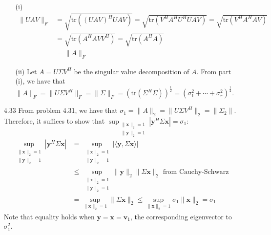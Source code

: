 \documentclass[letterpaper,12pt]{article}
\theoremstyle{definition}
\begin{document}
\begin{enumerate}
\begin{enumerate}
      \item[(i)]
      \begin{align*}
        \|UAV\|_F &= \sqrt{\text{tr}((UAV)^HUAV)} = \sqrt{\text{tr}(V^HA^HU^HUAV)} = \sqrt{\text{tr}(V^HA^HAV)} \\
        &= \sqrt{\text{tr}(A^HAVV^H)} = \sqrt{\text{tr}(A^HA)} \\
        &=\|A\|_F
      \end{align*}
      \item[(ii)]
        Let $A = U\Sigma V^H$ be the singular value decomposition of $A$. From part (i), we have that $\|A\|_F=\|U\Sigma V^H\|_F=\|\Sigma\|_F=(\text{tr}(\Sigma^H\Sigma))^\frac{1}{2}=(\sigma_1^2+\cdots+\sigma_r^2)^\frac{1}{2}$.
    \end{enumerate}
  \item[4.33]
    From problem 4.31, we have that $\sigma_1 = \|A\|_2=\|U\Sigma V^H\|_2=\|\Sigma_2\|$. Therefore, it suffices to show that $\sup_{\substack{\|\mathbf{x}\|_2=1\\ \|\mathbf{y}\|_2=1}}|\mathbf{y}^H\Sigma\mathbf{x}|=\sigma_1$:
    \begin{align*}
        \sup_{\substack{\|\mathbf{x}\|_2=1\\\|\mathbf{y}\|_2=1}}|\mathbf{y}^H\Sigma\mathbf{x}|&= \sup_{\substack{\|\mathbf{x}\|_2=1\\\|\mathbf{y}\|_2=1}} |\langle \mathbf{y},\Sigma\mathbf{x}\rangle| \\
        &\leq \sup_{\substack{\|\mathbf{x}\|_2=1\\\|\mathbf{y}\|_2=1}} \|\mathbf{y}\|_2\|\Sigma\mathbf{x}\|_2 \text{ from Cauchy-Schwarz} \\
        &= \sup_{\|\mathbf{x}\|_2=1}\|\Sigma\mathbf{x}\|_2 \leq \sup_{\|\mathbf{x}\|_2=1}\sigma_1\|\mathbf{x}\|_2 = \sigma_1
    \end{align*}
    Note that equality holds when $\mathbf{y}=\mathbf{x}=\mathbf{v}_1$, the corresponding eigenvector to $\sigma_1^2$.


\end{enumerate}
\end{document}
